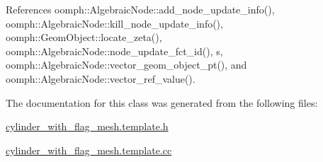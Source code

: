 References oomph\+::\+Algebraic\+Node\+::add\+\_\+node\+\_\+update\+\_\+info(), oomph\+::\+Algebraic\+Node\+::kill\+\_\+node\+\_\+update\+\_\+info(), oomph\+::\+Geom\+Object\+::locate\+\_\+zeta(), oomph\+::\+Algebraic\+Node\+::node\+\_\+update\+\_\+fct\+\_\+id(), s, oomph\+::\+Algebraic\+Node\+::vector\+\_\+geom\+\_\+object\+\_\+pt(), and oomph\+::\+Algebraic\+Node\+::vector\+\_\+ref\+\_\+value().



The documentation for this class was generated from the following files\+:\begin{DoxyCompactItemize}
\item 
\hyperlink{cylinder__with__flag__mesh_8template_8h}{cylinder\+\_\+with\+\_\+flag\+\_\+mesh.\+template.\+h}\item 
\hyperlink{cylinder__with__flag__mesh_8template_8cc}{cylinder\+\_\+with\+\_\+flag\+\_\+mesh.\+template.\+cc}\end{DoxyCompactItemize}
